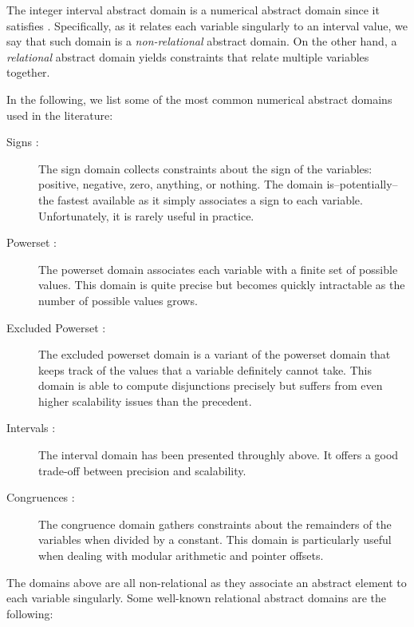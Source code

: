 \begin{remark}
  The integer interval abstract domain is a numerical abstract domain since it satisfies .
  Specifically, as it relates each variable singularly to an interval value, we say that such domain is a \emph{non-relational} abstract domain.
  On the other hand, a \emph{relational} abstract domain yields constraints that relate multiple variables together.
\end{remark}


In the following, we list some of the most common numerical abstract domains used in the literature:

\begin{description}
  \item[Signs \cite{Cousot1977}:]  The sign domain collects constraints about the sign of the variables: positive, negative, zero, anything, or nothing. The domain is--potentially--the fastest available as it simply associates a sign to each variable. Unfortunately, it is rarely useful in practice.
  \item[Powerset \cite{Min_e2017}:]  The powerset domain associates each variable with a finite set of possible values. This domain is quite precise but becomes quickly intractable as the number of possible values grows.
  \item[Excluded Powerset \cite{Monat2024}:]  The excluded powerset domain is a variant of the powerset domain that keeps track of the values that a variable definitely cannot take. This domain is able to compute disjunctions precisely but suffers from even higher scalability issues than the precedent.
  \item[Intervals \cite{Cousot1976,Hickey2001}:]  The interval domain has been presented throughly above. It offers a good trade-off between precision and scalability.
  \item[Congruences \cite{Granger1991}:]  The congruence domain gathers constraints about the remainders of the variables when divided by a constant. This domain is particularly useful when dealing with modular arithmetic and pointer offsets.
\end{description}
The domains above are all non-relational as they associate an abstract element to each variable singularly. Some well-known relational abstract domains are the following:
